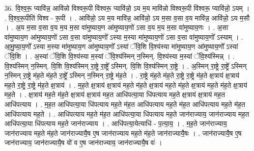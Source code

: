 \documentclass[17pt]{extarticle}
\begin{document}
36. वि॒श्व॒रू॒ प्यावि॑न्न॒ आवि॑न्नो विश्वरू॒पी वि॑श्वरू॒ प्यावि॑न्नो॒ ऽय म॒य मावि॑न्नो विश्वरू॒पी वि॑श्वरू॒ प्यावि॑न्नो॒ ऽयम् । . वि॒श्व॒रू॒पीति॑ विश्व - रू॒पी । . आवि॑न्नो॒ ऽय म॒य मावि॑न्न॒ आवि॑न्नो॒ ऽय म॒सा व॒सा व॒य मावि॑न्न॒ आवि॑न्नो॒ ऽय म॒सौ । . अ॒य म॒सा व॒सा व॒य म॒य म॒सा वा॑मुष्याय॒ण आ॑मुष्याय॒णो॑ ऽसा व॒य म॒य म॒सा वा॑मुष्याय॒णः । . अ॒सा वा॑मुष्याय॒ण आ॑मुष्याय॒णो॑ ऽसा व॒सा वा॑मुष्याय॒णो᳚ ऽस्या म॒स्या मा॑मुष्याय॒णो॑ ऽसा व॒सा वा॑मुष्याय॒णो᳚ ऽस्याम् । . आ॒मु॒ष्या॒य॒णो᳚ ऽस्या म॒स्या मा॑मुष्याय॒ण आ॑मुष्याय॒णो᳚ ऽस्यां ॅवि॒शि वि॒श्य॑स्या मा॑मुष्याय॒ण आ॑मुष्याय॒णो᳚ ऽस्यां ॅवि॒शि । . अ॒स्यां ॅवि॒शि वि॒श्य॑स्या म॒स्यां ॅवि॒श्य॑स्मिन् न॒स्मिन्. वि॒श्य॑स्या म॒स्यां ॅवि॒श्य॑स्मिन्न् । . वि॒श्य॑स्मिन् न॒स्मिन्. वि॒शि वि॒श्य॑स्मिन् रा॒ष्ट्रे रा॒ष्ट्रे᳚ ऽस्मिन्. वि॒शि वि॒श्य॑स्मिन् रा॒ष्ट्रे । . अ॒स्मिन् रा॒ष्ट्रे रा॒ष्ट्रे᳚ ऽस्मिन् न॒स्मिन् रा॒ष्ट्रे म॑ह॒ते म॑ह॒ते रा॒ष्ट्रे᳚ ऽस्मिन् न॒स्मिन् रा॒ष्ट्रे म॑ह॒ते । . रा॒ष्ट्रे म॑ह॒ते म॑ह॒ते रा॒ष्ट्रे रा॒ष्ट्रे म॑ह॒ते क्ष॒त्राय॑ क्ष॒त्राय॑ मह॒ते रा॒ष्ट्रे रा॒ष्ट्रे म॑ह॒ते क्ष॒त्राय॑ । . म॒ह॒ते क्ष॒त्राय॑ क्ष॒त्राय॑ मह॒ते म॑ह॒ते क्ष॒त्राय॑ मह॒ते म॑ह॒ते क्ष॒त्राय॑ मह॒ते म॑ह॒ते क्ष॒त्राय॑ मह॒ते । . क्ष॒त्राय॑ मह॒ते म॑ह॒ते क्ष॒त्राय॑ क्ष॒त्राय॑ मह॒त आधि॑पत्या॒या धि॑पत्याय मह॒ते क्ष॒त्राय॑ क्ष॒त्राय॑ मह॒त आधि॑पत्याय । . म॒ह॒त आधि॑पत्या॒या धि॑पत्याय मह॒ते म॑ह॒त आधि॑पत्याय मह॒ते म॑ह॒त आधि॑पत्याय मह॒ते म॑ह॒त आधि॑पत्याय मह॒ते । . आधि॑पत्याय मह॒ते म॑ह॒त आधि॑पत्या॒या धि॑पत्याय मह॒ते जान॑राज्याय॒ जान॑राज्याय मह॒त आधि॑पत्या॒या धि॑पत्याय मह॒ते जान॑राज्याय । . आधि॑पत्या॒येत्याधि॑ - प॒त्या॒य॒ । . म॒ह॒ते जान॑राज्याय॒ जान॑राज्याय मह॒ते म॑ह॒ते जान॑राज्यायै॒ष ए॒ष जान॑राज्याय मह॒ते म॑ह॒ते जान॑राज्यायै॒षः । . जान॑राज्यायै॒ष ए॒ष जान॑राज्याय॒ जान॑राज्यायै॒ष वो॑ व ए॒ष जान॑राज्याय॒ जान॑राज्यायै॒ष वः॑ । \newline
\end{document}
